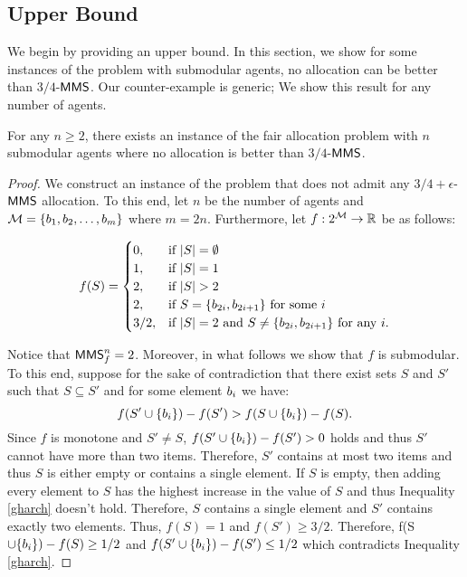 \subsection{Upper Bound}\label{submodular-upperbound}
We begin by providing an upper bound. In this section, we show for some instances of the problem with submodular agents, no allocation can be better than $3/4$-$\mathsf{MMS}$. Our counter-example is generic; We show this result for any number of agents.
\begin{theorem}\label{subupperbound}
	For any $n \geq 2$, there exists an instance of the fair allocation problem with $n$ submodular agents where no allocation is better than $3/4$-$\mathsf{MMS}$.
\end{theorem}
\begin{proof}
	We construct an instance of the problem that does not admit any $3/4+\epsilon$-$\mathsf{MMS}$ allocation. To this end, let $n$ be the number of agents and $\mathcal{M} = \{b_1, b_2, \ldots,b_m\}$ where $m = 2n$. Furthermore, let $f:2^{\mathcal{M}} \rightarrow \mathbb{R}$ be as follows:
	
	$$f(S) =
	\begin{cases}
	0, & \text{if }|S| = \emptyset \\
	1, & \text{if }|S| = 1  \\
	2, & \text{if }|S| > 2 \\
	2, & \text{if }S = \{b_{2i}, b_{2i+1} \} \text{ for some }i \\
	3/2, & \text{if }|S| = 2 \text{ and }S \neq \{b_{2i}, b_{2i+1} \} \text{ for any }i. \\
	\end{cases}$$
	
	Notice that $\mathsf{MMS}_f^n = 2$. Moreover, in what follows we show that $f$ is submodular. To this end, suppose for the sake of contradiction that there exist sets $S$ and $S'$ such that $S \subseteq S'$ and for some element $b_i$ we have:
	\begin{equation}
	f(S' \cup \{b_i\}) - f(S') > f(S \cup \{b_i\}) - f(S). \label{gharch}
	\end{equation}
	Since $f$ is monotone and $S' \neq S$, $f(S' \cup \{b_i\}) - f(S') > 0$ holds and thus $S'$ cannot have more than two items. Therefore, $S'$ contains at most two items and thus $S$ is either empty or contains a single element. If $S$ is empty, then adding every element to $S$ has the highest increase in the value of $S$ and thus Inequality \eqref{gharch} doesn't hold. Therefore, $S$ contains a single element and $S'$ contains exactly two elements. Thus, $f(S) = 1$ and $f(S') \geq 3/2$. Therefore, f(S $\cup \{b_i\}) - f(S) \geq 1/2$ and $f(S' \cup \{b_i\}) - f(S') \leq 1/2$ which contradicts Inequality \eqref{gharch}.
	

\end{proof}
